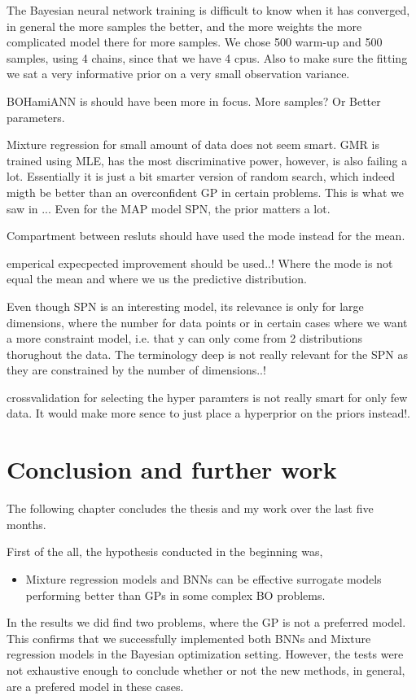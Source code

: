 The Bayesian neural network training is difficult to know when it has converged, in general the more samples the better, 
and the more weights the more complicated model there for more samples. We chose 500 warm-up and 500 samples, using 4
chains, since that we have 4 cpus. Also to make sure the fitting we sat a very informative prior on a very small observation
variance. 

BOHamiANN is should have been more in focus. More samples? Or Better parameters. 

Mixture regression for small amount of data does not seem smart. GMR is trained using MLE, has the most discriminative power,
however, is also failing a lot. Essentially it is just a bit smarter version of random search, which indeed migth be
better than an overconfident GP in certain problems. This is what we saw in ... Even for the MAP model SPN, the prior
matters a lot. 

Compartment between resluts should have used the mode instead for the mean. 

emperical expecpected improvement should be used..! Where the mode is not equal the mean and where we
us the predictive distribution. 

Even though SPN is an interesting model, its relevance is only for large dimensions, where the number for data points
or in certain cases where we want a more constraint model, i.e. that y can only come from 2 distributions thorughout the
data. The terminology deep is not really relevant for the SPN as they are constrained by the number of dimensions..!

crossvalidation for selecting the hyper paramters is not really smart for only few data. It would make more sence 
to just place a hyperprior on the priors instead!. 


\chapter{Conclusion and further work}
The following chapter concludes the thesis and my work over the last five months. 

First of the all, the hypothesis conducted in the beginning was, 
\begin{itemize}
    \item Mixture regression models and BNNs can be effective surrogate models
    performing better than GPs in some complex BO problems. 
\end{itemize}
In the results we did find two problems, where the GP is not a preferred model. This confirms that
we successfully implemented both BNNs and Mixture regression models in the Bayesian optimization setting.  
However, the tests were not exhaustive enough to conclude whether or not the new methods, in general, 
are a prefered model in these cases. 

